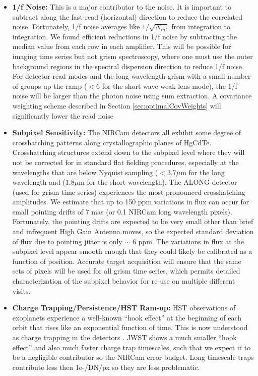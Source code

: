 \documentclass{aastex62}
\begin{document}
\begin{itemize}
	\item \textbf{1/f Noise:} This is a major contributor to the noise.
	It is important to subtract along the fast-read (horizontal) direction to reduce the correlated noise.
	Fortunately, 1/f noise averages like $1/\sqrt{N_{int}} $ from integration to integration.
	We found efficient reductions in 1/f noise by subtracting the median value from each row in each amplifier.
	This will be possible for imaging time series but not grism spectroscopy, where one must use the outer background regions in the spectral dispersion direction to reduce 1/f noise.
	For detector read modes and the long wavelength grism with a small number of groups up the ramp ($<6$ for the short wave weak lens mode), the 1/f noise will be larger than the photon noise using sum extraction.
	A covariance weighting scheme described in Section \ref{sec:optimalCovWeights} will significantly lower the read noise
	\item \textbf{Subpixel Sensitivity:} The NIRCam detectors all exhibit some degree of crosshatching patterns along crystallographic planes of HgCdTe.
	Crosshatching structures extend down to the subpixel level where they will not be corrected for in standard flat fielding procedures, especially at the wavelengths that are below Nyquist sampling ($< 3.7\mu$m for the long wavelength and ($1.8\mu$m for the short wavelength).
	The ALONG detector (used for grism time series) experiences the most pronounced crosshatching amplitudes.
	We estimate that up to 150 ppm variations in flux can occur for small pointing drifts of 7 mas (or 0.1 NIRCam long wavelength pixels).
	Fortunately, the pointing drifts are expected to be very small other than brief and infrequent High Gain Antenna moves, so the expected standard deviation of flux due to pointing jitter is only $\sim$ 6 ppm.
	The variations in flux at the subpixel level appear smooth enough that they could likely be calibrated as a function of position.
	Accurate target acquisition will ensure that the same sets of pixels will be used for all grism time series, which permits detailed characterization of the subpixel behavior for re-use on multiple different visits.
	\item \textbf{Charge Trapping/Persistence/HST Ram-up:} HST observations of exoplanets experience a well-known ``hook effect'' at the beginning of each orbit that rises like an exponential function of time.
	This is now understood as charge trapping in the detectors \citep{zhou2017chargeTrap}.
	JWST shows a much smaller ``hook effect'' and also much faster charge trap timescales, such that we expect it to be a negligible contributor so the NIRCam error budget.
	Long timescale traps contribute less then 1e-/DN/px so they are less problematic.
\end{itemize}
\end{document}
